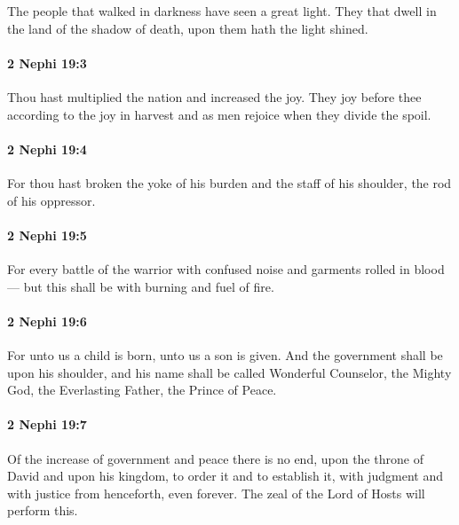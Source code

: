 			The people that walked in darkness have seen a great light.
			They that dwell in the land of the shadow of death,
			upon them hath the light shined.

		\paragraph{2 Nephi 19:3} %
			\label{2NEPHI-19-3}

			Thou hast multiplied the nation and increased the joy.
			They joy before thee according to the joy in harvest
			and as men rejoice when they divide the spoil.

		\paragraph{2 Nephi 19:4} %
			\label{2NEPHI-19-4}

			For thou hast broken the yoke of his burden
			and the staff of his shoulder, the rod of his oppressor.

		\paragraph{2 Nephi 19:5} %
			\label{2NEPHI-19-5}

			For every battle of the warrior with confused noise and garments rolled in blood---
			but this shall be with burning and fuel of fire.

		\paragraph{2 Nephi 19:6} %
			\label{2NEPHI-19-6}

			For unto us a child is born,
			unto us a son is given.
			And the government shall be upon his shoulder,
			and his name shall be called Wonderful Counselor,
			the Mighty God, the Everlasting Father, the Prince of Peace.

		\paragraph{2 Nephi 19:7} %
			\label{2NEPHI-19-7}

			Of the increase of government and peace there is no end,
			upon the throne of David and upon his kingdom,
			to order it and to establish it,
			with judgment and with justice
			from henceforth, even forever.
			The zeal of the Lord of Hosts will perform this.

